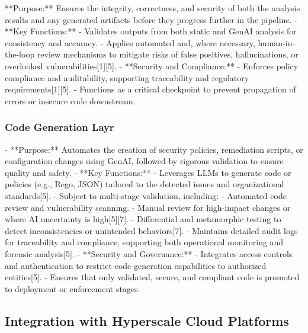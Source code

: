  **Purpose:**  
  Ensures the integrity, correctness, and security of both the analysis results and any generated artifacts before they progress further in the pipeline.
- **Key Functions:**  
  - Validates outputs from both static and GenAI analysis for consistency and accuracy.
  - Applies automated and, where necessary, human-in-the-loop review mechanisms to mitigate risks of false positives, hallucinations, or overlooked vulnerabilities[1][5].
- **Security and Compliance:**  
  - Enforces policy compliance and auditability, supporting traceability and regulatory requirements[1][5].
  - Functions as a critical checkpoint to prevent propagation of errors or insecure code downstream.


\subsubsection{Code Generation Layr} %
\label{sec:Code Generation Laye}

- **Purpose:**  
  Automates the creation of security policies, remediation scripts, or configuration changes using GenAI, followed by rigorous validation to ensure quality and safety.
- **Key Functions:**  
  - Leverages LLMs to generate code or policies (e.g., Rego, JSON) tailored to the detected issues and organizational standards[5].
  - Subject to multi-stage validation, including:
    - Automated code review and vulnerability scanning.
    - Manual review for high-impact changes or where AI uncertainty is high[5][7].
    - Differential and metamorphic testing to detect inconsistencies or unintended behaviors[7].
  - Maintains detailed audit logs for traceability and compliance, supporting both operational monitoring and forensic analysis[5].
- **Security and Governance:**  
  - Integrates access controls and authentication to restrict code generation capabilities to authorized entities[5].
  - Ensures that only validated, secure, and compliant code is promoted to deployment or enforcement stages.



\subsection{Integration with Hyperscale Cloud Platforms} %
\label{sec:Integration with Hyperscale Cloud Platforms}


